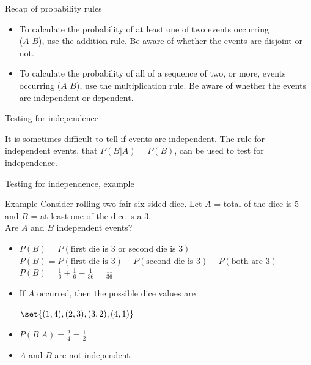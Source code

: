 \documentclass[xcolor=table, handout]{beamer}
\begin{document}
\begin{frame}{Recap of probability rules}
\begin{block}{}
\begin{itemize}
\item To calculate the probability of at least one of two events occurring\\ ($A$  $B$), use the addition rule. Be aware of whether the events are disjoint or not.

\pause
\item To calculate  the probability of all of a sequence of two, or more, events occurring ($A$  $B$), use the multiplication rule. Be aware of whether the events are independent or dependent.
\end{itemize}
\end{block}
\end{frame}

\begin{frame}{Testing for independence}
\begin{block}{}
It is sometimes difficult to tell if events are independent. The rule for independent events, that $P(B|A) = P(B)$, can be used to test for independence.
\end{block}
\end{frame}

\begin{frame}{Testing for independence, example}
\begin{exampleblock}{Example}
Consider rolling two fair six-sided dice. Let $A$ = total of the dice is 5 and $B$ = at least one of the dice is a 3.\\
\medskip
Are $A$ and $B$ independent events?
\begin{itemize}
\pause
\item $P(B) = P(\text{first die is 3 or second die is 3}) $\\
$P(B) = P(\text{first die is 3}) + P(\text{second die is 3}) - P(\text{both are 3}) $\\
$P(B) = \frac 1 6 + \frac 1 6 - \frac 1 {36} = \frac {11}{36}$
\pause
\item If $A$ occurred, then the possible dice values are\\ 
{\centering $\set{(1,4), (2,3), (3,2), (4,1)}$\par }

\pause
\item $P(B|A) = \frac 2 4 = \frac 1 2$

\pause
\item $A$ and $B$ are not independent.
\end{itemize} 
\end{exampleblock}
\end{frame}
\end{document}

